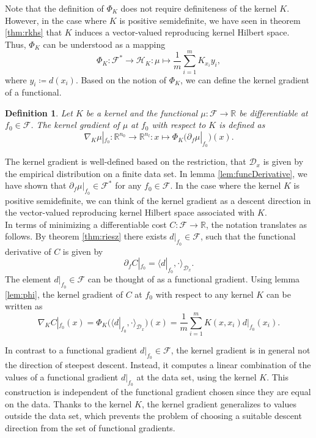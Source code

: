 \documentclass[11pt, a4paper]{article}
\newtheorem{definition}[theorem]{Definition}
\newcommand{\R}{\mathbb{R}}
\newcommand{\D}{\mathcal{D}}
\newcommand{\F}{\mathcal{F}}
\renewcommand{\H}{\mathcal{H}}
\begin{document}
Note that the definition of $\Phi_K$ does not require definiteness of the kernel $K$. However, in the case where $K$ is positive semidefinite, we have seen in theorem \ref{thm:rkhs} that $K$ induces a vector-valued reproducing kernel Hilbert space. Thus, $\Phi_K$ can be understood as a mapping
\[ \Phi_K: \F^* \to \H_K : \mu \mapsto \frac{1}{m} \sum_{i=1}^{m} K_{x_i}y_i, \]
where $y_i \coloneq d(x_i)$. Based on the notion of $\Phi_K$, we can define the kernel gradient of a functional.

\begin{definition}
Let $K$ be a kernel and the functional $\mu : \F \to \R$ be differentiable at $f_0 \in \F$. The kernel gradient of $\mu$ at $f_0$ with respect to $K$ is defined as
\[ \nabla_K\mu|_{f_0}: \R^{n_0} \to \R^{n_l} : x \mapsto \Phi_K \Big ( \partial_f\mu|_{f_0} \Big )(x). \]
\end{definition}

The kernel gradient is well-defined based on the restriction, that $\D_x$ is given by the empirical distribution on a finite data set. In lemma \ref{lem:funcDerivative}, we have shown that  $\partial_f \mu |_{f_0} \in \F^*$ for any $f_0 \in \F$. In the case where the kernel $K$ is positive semidefinite, we can think of the kernel gradient as a descent direction in the vector-valued reproducing kernel Hilbert space associated with $K$. \\

In terms of minimizing a differentiable cost $C: \F \to \R$, the notation translates as follows. By theorem \ref{thm:riesz} there exists $d|_{f_0} \in \F$, such that the functional derivative of $C$ is given by
\[ \partial_{f} C |_{f_0} = \big \langle d|_{f_0}, \cdot \big \rangle_{\D_x}. \]
The element $d|_{f_0} \in \F$ can be thought of as a functional gradient. Using lemma \ref{lem:phi}, the kernel gradient of $C$ at $f_0$ with respect to any kernel $K$ can be written as
\[ \nabla_KC|_{f_0}(x) = \Phi_K \Big ( \big \langle d|_{f_0} , \cdot \big \rangle_{\D_x} \Big )(x) = \frac{1}{m} \sum_{i=1}^{m} K(x,x_i)d|_{f_0}(x_i). \]

In contrast to a functional gradient $d|_{f_0} \in \F$, the kernel gradient is in general not the direction of steepest descent. Instead, it computes a linear combination of the values of a functional gradient $d|_{f_0}$ at the data set, using the kernel $K$. This construction is independent of the functional gradient chosen since they are equal on the data. Thanks to the kernel $K$, the kernel gradient generalizes to values outside the data set, which prevents the problem of choosing a suitable descent direction from the set of functional gradients. \\
\end{document}
